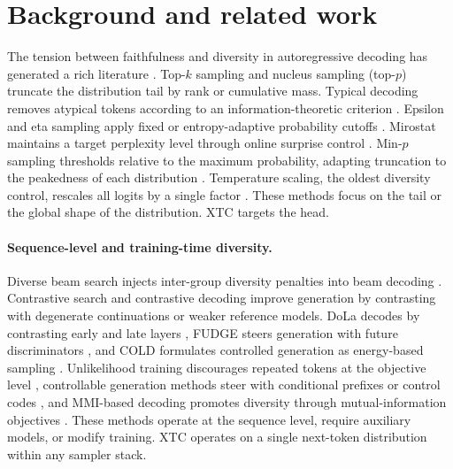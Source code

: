 \documentclass{article}
\newcommand{\xtc}{\textsc{XTC}}
\begin{document}
\section{Background and related work}
\label{sec:related}

The tension between faithfulness and diversity in autoregressive decoding has generated a rich literature \citep{gatt2018survey, wiher2022decoding, li2022pretrained}.
Top-$k$ sampling \citep{fan2018hierarchical} and nucleus sampling (top-$p$) \citep{holtzman2020curious} truncate the distribution tail by rank or cumulative mass.
Typical decoding removes atypical tokens according to an information-theoretic criterion \citep{meister2023typical}.
Epsilon and eta sampling apply fixed or entropy-adaptive probability cutoffs \citep{hewitt2022truncation}.
Mirostat maintains a target perplexity level through online surprise control \citep{basu2021mirostat}.
Min-$p$ sampling thresholds relative to the maximum probability, adapting truncation to the peakedness of each distribution \citep{ICLR2025_afa5f124}.
Temperature scaling, the oldest diversity control, rescales all logits by a single factor \citep{ackley1985learning, renze2024effect}.
These methods focus on the tail or the global shape of the distribution.
\xtc{} targets the head.

\paragraph{Sequence-level and training-time diversity.}
Diverse beam search injects inter-group diversity penalties into beam decoding \citep{vijayakumar2018diverse}.
Contrastive search \citep{su2022contrastive} and contrastive decoding \citep{li2023contrastive} improve generation by contrasting with degenerate continuations or weaker reference models.
DoLa decodes by contrasting early and late layers \citep{chuang2023dola}, FUDGE steers generation with future discriminators \citep{Yang_2021}, and COLD formulates controlled generation as energy-based sampling \citep{qin2022cold}.
Unlikelihood training discourages repeated tokens at the objective level \citep{welleck2020neural}, controllable generation methods steer with conditional prefixes or control codes \citep{keskar2019ctrl}, and MMI-based decoding promotes diversity through mutual-information objectives \citep{li2016diversity}.
These methods operate at the sequence level, require auxiliary models, or modify training. \xtc{} operates on a single next-token distribution within any sampler stack.
\end{document}
